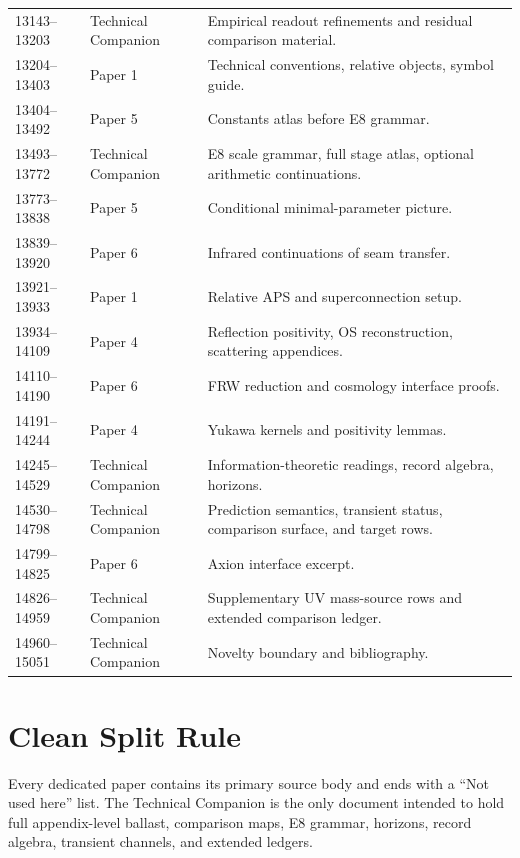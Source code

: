 \documentclass[11pt,a4paper]{article}
\begin{document}
\begin{longtable}{@{}p{}p{}p{}@{}}
13143--13203 & Technical Companion & Empirical readout refinements and residual comparison material.\\
13204--13403 & Paper 1 & Technical conventions, relative objects, symbol guide.\\
13404--13492 & Paper 5 & Constants atlas before E8 grammar.\\
13493--13772 & Technical Companion & E8 scale grammar, full stage atlas, optional arithmetic continuations.\\
13773--13838 & Paper 5 & Conditional minimal-parameter picture.\\
13839--13920 & Paper 6 & Infrared continuations of seam transfer.\\
13921--13933 & Paper 1 & Relative APS and superconnection setup.\\
13934--14109 & Paper 4 & Reflection positivity, OS reconstruction, scattering appendices.\\
14110--14190 & Paper 6 & FRW reduction and cosmology interface proofs.\\
14191--14244 & Paper 4 & Yukawa kernels and positivity lemmas.\\
14245--14529 & Technical Companion & Information-theoretic readings, record algebra, horizons.\\
14530--14798 & Technical Companion & Prediction semantics, transient status, comparison surface, and target rows.\\
14799--14825 & Paper 6 & Axion interface excerpt.\\
14826--14959 & Technical Companion & Supplementary UV mass-source rows and extended comparison ledger.\\
14960--15051 & Technical Companion & Novelty boundary and bibliography.\\
\bottomrule
\end{longtable}
\section{Clean Split Rule}
Every dedicated paper contains its primary source body and ends with a ``Not used here'' list. The
Technical Companion is the only document intended to hold full appendix-level ballast, comparison
maps, E8 grammar, horizons, record algebra, transient channels, and extended ledgers.
\end{document}
